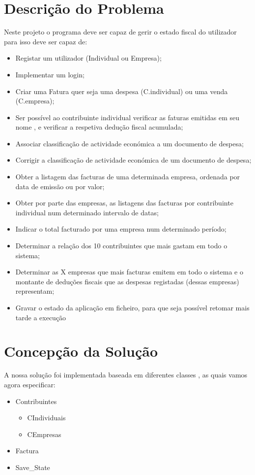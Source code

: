\documentclass[a4paper]{article}
\begin{document}
\section{Descrição do Problema}
\label{sec:descricao do problema}
Neste projeto o programa deve ser capaz de gerir o estado fiscal do utilizador para isso deve ser capaz de:

\begin{itemize}
\item Registar um utilizador (Individual ou Empresa);
\item Implementar um login;
\item Criar uma Fatura quer seja uma despesa (C.individual) ou uma venda (C.empresa);
\item Ser possível ao contribuinte individual verificar as faturas emitidas em seu nome , e verificar a respetiva dedução fiscal acumulada;
\item Associar classificação de actividade económica a um documento de despesa;
\item Corrigir a classificação de actividade económica de um documento de despesa;
\item Obter a listagem das facturas de uma determinada empresa, ordenada por data de emissão
ou por valor;
\item Obter por parte das empresas, as listagens das facturas por contribuinte individual num determinado
intervalo de datas;
\item Indicar o total facturado por uma empresa num determinado período;
\item Determinar a relação dos 10 contribuintes que mais gastam em todo o sistema;
\item Determinar as X empresas que mais facturas emitem em todo o sistema e o montante de
deduções fiscais que as despesas registadas (dessas empresas) representam;
\item Gravar o estado da aplicação em ficheiro, para que seja possível retomar mais tarde a execução

\end{itemize}

\pagebreak

\section{Concepção da Solução}
\label{sec:solucao}
A nossa solução foi implementada baseada em diferentes classes , as quais vamos agora especificar:

\begin{itemize}
	\item{Contribuintes}
		\begin{itemize}
			\item{CIndividuais}
			\item{CEmpresas}
		\end{itemize}
	\item{Factura}
	\item{Save_State}
\end{itemize}
\end{document}

